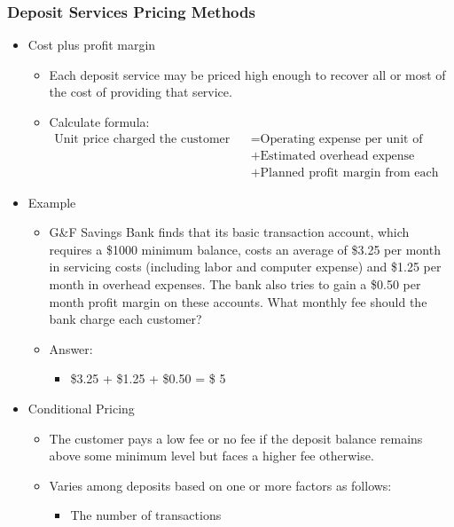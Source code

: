 \subsubsection{Deposit Services Pricing Methods}
\begin{itemize}
\item Cost plus profit margin
    \begin{itemize}
    \item Each deposit service may be priced high enough to recover all or most of the cost of providing that service.
    \item Calculate formula:
    \begin{align*}
        \text{Unit price charged the customer for each deposit service} &= \text{Operating expense per unit of deposit service} \nonumber \\
        &+ \text{Estimated overhead expense allocated to deposit service} \nonumber \\
        &+ \text{Planned profit margin from each service unit sold}
        \end{align*}
    \end{itemize}
\item Example
    \begin{itemize}
    \item G\&F Savings Bank finds that its basic transaction account, which requires a \$1000 minimum balance, costs an average of \$3.25 per month in servicing costs (including labor and computer expense) and \$1.25 per month in overhead expenses. The bank also tries to gain a \$0.50 per month profit margin on these accounts. What monthly fee should the bank charge each customer?
    \item Answer:
        \begin{itemize}
        \item \$3.25 + \$1.25 + \$0.50 = \$ 5
        \end{itemize}
    \end{itemize}
\item Conditional Pricing
    \begin{itemize}
    \item The customer pays a low fee or no fee if the deposit balance remains above some minimum level but faces a higher fee otherwise.
    \item Varies among deposits based on one or more factors as follows:
        \begin{itemize}
        \item The number of transactions

\end{itemize}
\end{itemize}
\end{itemize}
